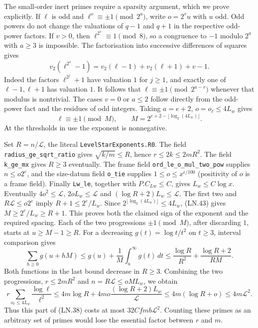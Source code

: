 The small-order inert primes require a sparsity argument, which
we prove explicitly.  If $\ell$ is odd and
$\ell^o\equiv\pm1\pmod{2^a}$, write $o=2^vu$ with $u$ odd.
Odd powers do not change the valuations of $q-1$ and $q+1$ in
the respective odd-power factors.  If $v>0$, then
$\ell^{2^v}\equiv1\pmod8$, so a congruence to $-1$ modulo
$2^a$ with $a\ge3$ is impossible.  The factorisation into
successive differences of squares gives
\[
 v_2(\ell^{2^v}-1)=v_2(\ell-1)+v_2(\ell+1)+v-1.
 \tag{LN.42}
\]
Indeed the factors $\ell^{2^j}+1$ have valuation $1$ for
$j\ge1$, and exactly one of $\ell-1,\ell+1$ has valuation $1$.
It follows that $\ell\equiv\pm1\pmod{2^{a-v}}$ whenever that
modulus is nontrivial.  The cases $v=0$ or $a\le2$ follow directly
from the odd-power fact and the residues of odd integers.
Taking $a=e+2$, $o=o_\ell\le4L_w$ gives
\[
 \ell\equiv\pm1\pmod M,\qquad
 M=2^{e+2-\lfloor\log_2(4L_w)\rfloor}.               \tag{LN.43}
\]
At the thresholds in use the exponent is nonnegative.

Set $R=n/\mathcal L$, the literal \texttt{LevelStarExponents.R0}.
The field \texttt{radius\_ge\_sqrt\_ratio} gives
$\sqrt{k/m}\le R$, hence $r\le2k\le2mR^2$.
The field \texttt{k\_ge\_mx} gives $R\ge3$ eventually.
The frame field \texttt{ord\_le\_o\_mul\_two\_pow} supplies
$n\le o2^e$, and the size-datum field \texttt{o\_tie} supplies
$1\le o\le x^{\epsilon/100}$ (positivity of $o$ is a frame field).
Finally \texttt{Lw\_le}, together with $P.C_{Lw}\le C$, gives
$L_w\le C\log x$.
Eventually $4o^2\le\mathcal L$,
$2oL_w\le\mathcal L$ and
$(\log R+2)L_w\le\mathcal L$.  The first two and
$R\mathcal L\le o2^e$ imply
$R+1\le2^e/L_w$.  Since
$2^{\lfloor\log_2(4L_w)\rfloor}\le4L_w$, (LN.43) gives
$M\ge2^e/L_w\ge R+1$.  This proves both the claimed sign of
the exponent and the required spacing.  Each of the two progressions
$\pm1\pmod M$, after discarding $1$, starts at $u\ge M-1\ge R$.
For a decreasing $g(t)=\log t/t^2$ on $t\ge3$, interval comparison
gives
\[
 \sum_{h\ge0}g(u+hM)
 \le g(u)+\frac1M\int_u^\infty g(t)\,dt
 \le\frac{\log R}{R^2}+\frac{\log R+2}{RM}.
 \tag{LN.44}
\]
Both functions in the last bound decrease in $R\ge3$.
Combining the two progressions, $r\le2mR^2$ and
$n=R\mathcal L\le oML_w$, we obtain
\[
 r\sum_{o_\ell\le4L_w}\frac{\log\ell}{\ell^2}
 \le4m\log R+
       4mo\frac{(\log R+2)L_w}{\mathcal L}
 \le4m(\log R+o)\le4m\mathcal L^2.                 \tag{LN.45}
\]
Thus this part of (LN.38) costs at most
$32Cfmb\mathcal L^2$.  Counting these primes as an arbitrary
set of primes would lose the essential factor between $r$ and $m$.

